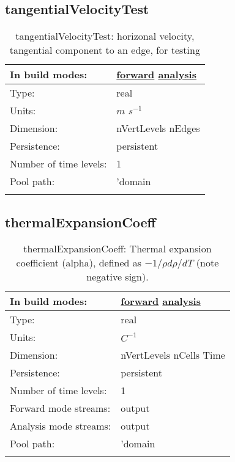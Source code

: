 \subsection[tangentialVelocityTest]{tangentialVelocityTest}
\label{subsec:var_sec_scratch_tangentialVelocityTest}
\begin{center}
\begin{longtable}{| p{2.0in} | p{4.0in} |}
        \hline 
        In build modes: & \hyperref[subsec:forward_var_tab_scratch]{forward} \hyperref[subsec:analysis_var_tab_scratch]{analysis} \\
        \hline 
        Type: & real \\
        \hline 
        Units: & $m$ $s^{-1}$ \\
        \hline 
        Dimension: & nVertLevels nEdges \\
        \hline 
        Persistence: & persistent \\
        \hline 
        Number of time levels: & 1 \\
        \hline 
            Pool path: & 'domain %
 \\
		 \hline 
    \caption{tangentialVelocityTest: horizonal velocity, tangential component to an edge, for testing}
\end{longtable}
\end{center}
\subsection[thermalExpansionCoeff]{thermalExpansionCoeff}
\label{subsec:var_sec_scratch_thermalExpansionCoeff}
\begin{center}
\begin{longtable}{| p{2.0in} | p{4.0in} |}
        \hline 
        In build modes: & \hyperref[subsec:forward_var_tab_scratch]{forward} \hyperref[subsec:analysis_var_tab_scratch]{analysis} \\
        \hline 
        Type: & real \\
        \hline 
        Units: & $C^{-1}$ \\
        \hline 
        Dimension: & nVertLevels nCells Time \\
        \hline 
        Persistence: & persistent \\
        \hline 
        Number of time levels: & 1 \\
        \hline 
		 Forward mode streams: &  output \\
        \hline 
		 Analysis mode streams: &  output \\
        \hline 
            Pool path: & 'domain %
 \\
		 \hline 
    \caption{thermalExpansionCoeff:  Thermal expansion coefficient (alpha), defined as  $-1/\rho d\rho/dT$  (note negative sign).}
\end{longtable}
\end{center}
